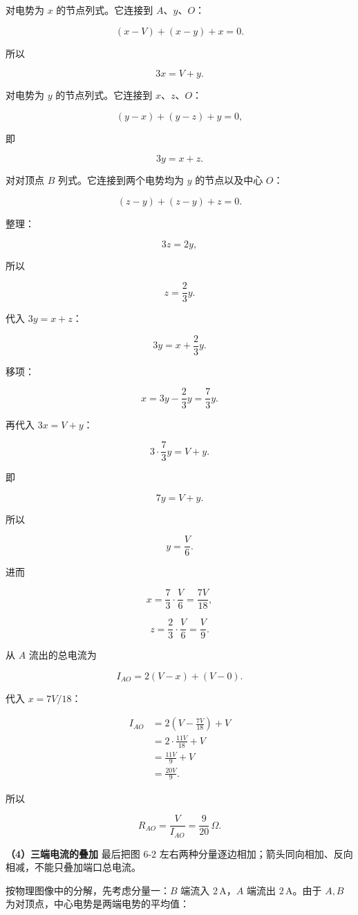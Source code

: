 \documentclass[12pt,a4paper,UTF8]{ctexart}
\begin{document}
对电势为 \(x\) 的节点列式。它连接到 \(A\)、\(y\)、\(O\)：

\[ (x-V)+(x-y)+x=0.\]

所以

\[3x=V+y.\]

对电势为 \(y\) 的节点列式。它连接到 \(x\)、\(z\)、\(O\)：

\[ (y-x)+(y-z)+y=0,\]

即

\[3y=x+z.\]

对对顶点 \(B\) 列式。它连接到两个电势均为 \(y\) 的节点以及中心 \(O\)：

\[ (z-y)+(z-y)+z=0.\]

整理：

\[3z=2y,\]

所以

\[z=\frac23y.\]

代入 \(3y=x+z\)：

\[3y=x+\frac23y.\]

移项：

\[x=3y-\frac23y=\frac73y.\]

再代入 \(3x=V+y\)：

\[3\cdot\frac73y=V+y.\]

即

\[7y=V+y.\]

所以

\[y=\frac V6.\]

进而

\[x=\frac73\cdot\frac V6=\frac{7V}{18},\]

\[z=\frac23\cdot\frac V6=\frac V9.\]

从 \(A\) 流出的总电流为

\[I_{AO}
=2(V-x)+(V-0).\]

代入 \(x=7V/18\)：

\[\begin{aligned}
I_{AO}
&=2\left(V-\frac{7V}{18}\right)+V\\
&=2\cdot\frac{11V}{18}+V\\
&=\frac{11V}{9}+V\\
&=\frac{20V}{9}.
\end{aligned}\]

所以

\[\boxed{
R_{AO}
=\frac{V}{I_{AO}}
=\frac9{20}\,\Omega
}.\]

\textbf{（4）三端电流的叠加} 最后把图 6-2
左右两种分量逐边相加；箭头同向相加、反向相减，不能只叠加端口总电流。

按物理图像中的分解，先考虑分量一：\(B\) 端流入 \(2\,\mathrm A\)，\(A\)
端流出 \(2\,\mathrm A\)。由于 \(A,B\)
为对顶点，中心电势是两端电势的平均值：
\end{document}
